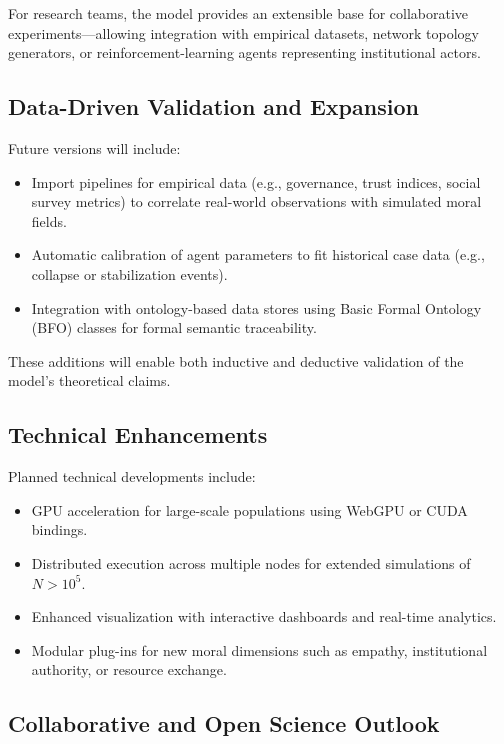 \documentclass[11pt]{article}
\begin{document}
For research teams, the model provides an extensible base for collaborative experiments—allowing integration with empirical datasets, network topology generators, or reinforcement-learning agents representing institutional actors.

\subsection{Data-Driven Validation and Expansion}

Future versions will include:
\begin{itemize}
  \item Import pipelines for empirical data (e.g., governance, trust indices, social survey metrics) to correlate real-world observations with simulated moral fields.
  \item Automatic calibration of agent parameters to fit historical case data (e.g., collapse or stabilization events).
  \item Integration with ontology-based data stores using Basic Formal Ontology (BFO) classes for formal semantic traceability.
\end{itemize}

These additions will enable both inductive and deductive validation of the model’s theoretical claims.

\subsection{Technical Enhancements}

Planned technical developments include:
\begin{itemize}
  \item GPU acceleration for large-scale populations using WebGPU or CUDA bindings.
  \item Distributed execution across multiple nodes for extended simulations of \(N > 10^5\).
  \item Enhanced visualization with interactive dashboards and real-time analytics.
  \item Modular plug-ins for new moral dimensions such as empathy, institutional authority, or resource exchange.
\end{itemize}

\subsection{Collaborative and Open Science Outlook}
\end{document}
